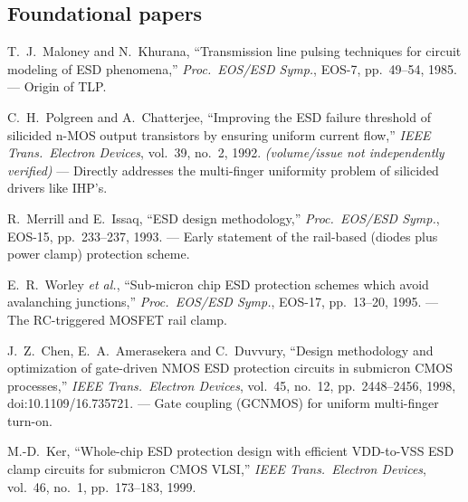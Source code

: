 \documentclass[11pt,a4paper]{article}
\begin{document}
\subsection*{Foundational papers}
\begin{enumerate}[label={[P\arabic*]}, leftmargin=*]
  \item T.~J.~Maloney and N.~Khurana, ``Transmission line pulsing techniques
        for circuit modeling of ESD phenomena,'' \emph{Proc.\ EOS/ESD Symp.},
        EOS-7, pp.~49--54, 1985. --- Origin of TLP.
  \item C.~H.~Polgreen and A.~Chatterjee, ``Improving the ESD failure threshold
        of silicided n-MOS output transistors by ensuring uniform current
        flow,'' \emph{IEEE Trans.\ Electron Devices}, vol.~39, no.~2, 1992.
        \emph{(volume/issue not independently verified)} --- Directly addresses
        the multi-finger uniformity problem of silicided drivers like IHP's.
  \item R.~Merrill and E.~Issaq, ``ESD design methodology,'' \emph{Proc.\
        EOS/ESD Symp.}, EOS-15, pp.~233--237, 1993. --- Early statement of the
        rail-based (diodes plus power clamp) protection scheme.
  \item E.~R.~Worley \emph{et al.}, ``Sub-micron chip ESD protection schemes
        which avoid avalanching junctions,'' \emph{Proc.\ EOS/ESD Symp.},
        EOS-17, pp.~13--20, 1995. --- The RC-triggered MOSFET rail clamp.
  \item J.~Z.~Chen, E.~A.~Amerasekera and C.~Duvvury, ``Design methodology and
        optimization of gate-driven NMOS ESD protection circuits in submicron
        CMOS processes,'' \emph{IEEE Trans.\ Electron Devices}, vol.~45, no.~12,
        pp.~2448--2456, 1998, doi:10.1109/16.735721. --- Gate coupling
        (GCNMOS) for uniform multi-finger turn-on.
  \item M.-D.~Ker, ``Whole-chip ESD protection design with efficient
        VDD-to-VSS ESD clamp circuits for submicron CMOS VLSI,'' \emph{IEEE
        Trans.\ Electron Devices}, vol.~46, no.~1, pp.~173--183, 1999.
\end{enumerate}
\end{document}

